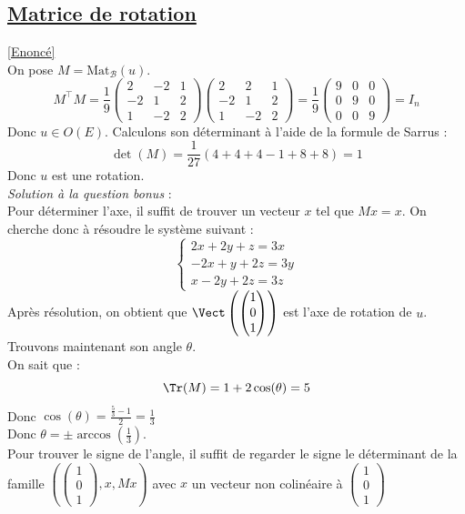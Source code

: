 \documentclass[8pt]{book}
\begin{document}
	\subsection{\underline{Matrice de rotation} }
	\label{Matrice de rotation corrigé}
	\textcolor{blue}{\hyperref[Matrice de rotation]{[Enoncé]}}\\
	On pose $M=\text{Mat}_\mathcal{B}(u)$.
	\[M^\top M=\frac{1}{9}\begin{pmatrix}
		2&-2&1\\
		-2&1&2\\
		1&-2&2
	\end{pmatrix}\begin{pmatrix}
	2&2&1\\
	-2&1&2\\
	1&-2&2
	\end{pmatrix}=\frac{1}{9}\begin{pmatrix}
	9&0&0\\
	0&9&0\\
	0&0&9
	\end{pmatrix}=I_n\]
	Donc $u\in O(E)$.
	Calculons son déterminant à l'aide de la formule de Sarrus : \[\det(M)=\frac{1}{27}\left(4+4+4-1+8+8\right)=1\]
	Donc $u$ est une rotation. \\
	\textit{Solution à la question bonus} :\\
	Pour déterminer l'axe, il suffit de trouver un vecteur $x$ tel que $Mx=x$.
	On cherche donc à résoudre le système suivant : 
	\[\begin{cases}
		2x+2y+z=3x\\
		-2x+y+2z=3y\\
		x-2y+2z=3z
	\end{cases}\]
	Après résolution, on obtient que $\Vect\left(\begin{pmatrix}
		1\\0\\1
	\end{pmatrix}\right)$ est l'axe de rotation de $u$.\\
	Trouvons maintenant son angle $\theta$.\\
	On sait que : \[
		\Tr(M)=1+2\cos(\theta)=5\\
	\]
	Donc $\cos(\theta)=\frac{\frac{5}{3}-1}{2}=\frac{1}{3}$\\
	Donc $\theta=\pm \arccos\left(\frac{1}{3}\right)$.\\
	Pour trouver le signe de l'angle, il suffit de regarder le signe le déterminant de la famille $\left(\begin{pmatrix}
		1\\0\\1
	\end{pmatrix}, x, Mx\right)$ avec $x$ un vecteur non colinéaire à $\begin{pmatrix}
	1\\0\\1
	\end{pmatrix}$
\end{document}
